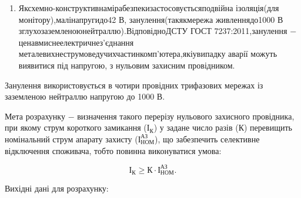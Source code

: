 \begin{enumerate}
	\item Як\hfill схемно-конструктивна\hfill міра\hfill безпеки\hfill застосовується\hfill подвійна\newline \hspace*{-18mm} ізоляція\hfill (для монітору),\hfill малі\hfill напруги\hfill до\hfill 42 В, занулення\hfill (так\hfill як\hfill мережа\newline \hspace*{-18mm} живлення\hfill до\hfill 1000 В з\hfill глухо\hfill заземленою\hfill нейтраллю).\hfill Відповідно\hfill ДСТУ\newline \hspace*{-18mm} ГОСТ 7237:2011,\hfill занулення $-$ це\hfill навмисне\hfill електричне\hfill з’єднання\newline \hspace*{-18mm} металевих\hfill неструмоведучих\hfill частин\hfill комп’ютера,\hfill які\hfill у\hfill випадку\newline \hspace*{-18mm} аварії можуть виявитися під напругою, з нульовим захисним провідником.
\end{enumerate}

Занулення використовується в чотири провідних трифазових мережах із заземленою нейтраллю напругою до 1000 В.

Мета розрахунку $-$ визначення такого перерізу нульового захисного провідника, при якому струм короткого замикання ($\text{І}_{\text{К}}$) у задане число разів ($\text{К}$) перевищить номінальний струм апарату захисту ($\text{І}^{\text{АЗ}}_{\text{НОМ}}$), що забезпечить селективне відключення споживача, тобто повинна виконуватися умова:

\begin{equation}\label{eq:work1}
	\text{І}_{\text{К}} \ge \text{К} \cdot \text{І}^{\text{АЗ}}_{\text{НОМ}}.
\end{equation}

\vspace{1.5em}

Вихідні дані для розрахунку:

